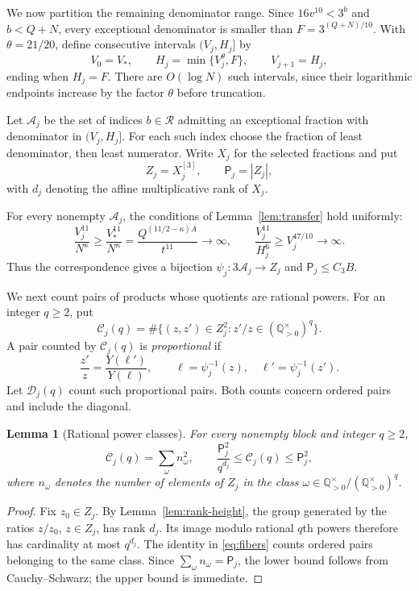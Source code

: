 \documentclass[11pt,reqno]{amsart}
\theoremstyle{definition}
\newcommand{\Q}{\mathbb Q}
\theoremstyle{plain}
\newtheorem{lemma}{Lemma}[section]
\theoremstyle{definition}
\theoremstyle{remark}
\newcommand{\RR}{\mathcal R}
\newcommand{\Bad}{\mathcal A}
\begin{document}
We now partition the remaining denominator range.
Since $16v^{10}<3^b$ and $b<Q+N$, every exceptional
denominator is smaller than $F=3^{(Q+N)/10}$.
With $\theta=21/20$, define consecutive intervals
$(V_j,H_j]$ by
\begin{equation}\label{eq:large-blocks}
 V_0=V_*,\qquad
 H_j=\min\{V_j^\theta,F\},\qquad
 V_{j+1}=H_j,
\end{equation}
ending when $H_j=F$. There are $O(\log N)$ such
intervals, since their logarithmic endpoints
increase by the factor $\theta$ before truncation.

Let $\Bad_j$ be the set of indices $b\in\RR$
admitting an exceptional fraction with denominator
in $(V_j,H_j]$. For each such index choose the
fraction of least denominator, then least numerator.
Write $X_j$ for the selected fractions and put
\[
 Z_j=X_j^{[3]},\qquad
 \mathsf P_j=|Z_j|,
\]
with $d_j$ denoting the affine multiplicative rank
of $X_j$.

For every nonempty $\Bad_j$, the conditions of
Lemma~\ref{lem:transfer} hold uniformly:
\[
 \frac{V_j^{11}}{N^\kappa}
 \ge\frac{V_*^{11}}{N^\kappa}
 =\frac{Q^{(11/2-\kappa)A}}{t^{11}}\longrightarrow\infty,
 \qquad
 \frac{V_j^{11}}{H_j^6}
 \ge V_j^{47/10}\longrightarrow\infty.
\]
Thus the correspondence gives a bijection
$\psi_j:3\Bad_j\to Z_j$ and
$\mathsf P_j\le C_3B$.

We next count pairs of products whose quotients
are rational powers. For an integer $q\ge2$, put
\[
 \mathcal C_j(q)=
 \#\{(z,z')\in Z_j^2:
 z'/z\in(\Q_{>0}^{\times})^q\}.
\]
A pair counted by $\mathcal C_j(q)$ is
\emph{proportional} if
\[
 \frac{z'}z=\frac{Y(\ell')}{Y(\ell)},
 \qquad
 \ell=\psi_j^{-1}(z),\quad
 \ell'=\psi_j^{-1}(z').
\]
Let $\mathcal D_j(q)$ count such proportional pairs.
Both counts concern ordered pairs and include the diagonal.

\begin{lemma}[Rational power classes]\label{lem:fibers}
For every nonempty block and integer $q\ge2$,
\begin{equation}\label{eq:fibers}
 \mathcal C_j(q)=\sum_\omega n_\omega^2,\qquad
 \frac{\mathsf P_j^2}{q^{d_j}}
 \le\mathcal C_j(q)\le\mathsf P_j^2,
\end{equation}
where $n_\omega$ denotes the number of elements
of $Z_j$ in the class
$\omega\in\Q_{>0}^{\times}/(\Q_{>0}^{\times})^q$.
\end{lemma}

\begin{proof}
Fix $z_0\in Z_j$. By
Lemma~\ref{lem:rank-height}, the group generated
by the ratios $z/z_0$, $z\in Z_j$, has rank $d_j$.
Its image modulo rational $q$th powers therefore
has cardinality at most $q^{d_j}$.
The identity in \eqref{eq:fibers} counts ordered
pairs belonging to the same class. Since
$\sum_\omega n_\omega=\mathsf P_j$, the lower
bound follows from Cauchy--Schwarz; the upper
bound is immediate.
\end{proof}
\end{document}
